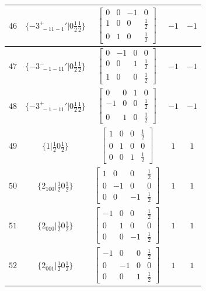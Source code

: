 \documentclass[fleqn,8pt]{jsarticle}
\begin{document}
\begin{longtable}{ccccc}
$ 46 $ & $ \{-3^{+}_{\,\,-11-1}{}'|0 \frac{1}{2} \frac{1}{2}\} $ & $ \begin{bmatrix} 0 & 0 & -1 & 0 \\ 1 & 0 & 0 & \frac{1}{2} \\ 0 & 1 & 0 & \frac{1}{2} \end{bmatrix} $ & $ -1 $ & $ -1 $ \\ \hline
$ 47 $ & $ \{-3^{-}_{\,\,-1-11}{}'|0 \frac{1}{2} \frac{1}{2}\} $ & $ \begin{bmatrix} 0 & -1 & 0 & 0 \\ 0 & 0 & 1 & \frac{1}{2} \\ 1 & 0 & 0 & \frac{1}{2} \end{bmatrix} $ & $ -1 $ & $ -1 $ \\ \hline
$ 48 $ & $ \{-3^{+}_{\,\,-1-11}{}'|0 \frac{1}{2} \frac{1}{2}\} $ & $ \begin{bmatrix} 0 & 0 & 1 & 0 \\ -1 & 0 & 0 & \frac{1}{2} \\ 0 & 1 & 0 & \frac{1}{2} \end{bmatrix} $ & $ -1 $ & $ -1 $ \\ \hline
$ 49 $ & $ \{1|\frac{1}{2} 0 \frac{1}{2}\} $ & $ \begin{bmatrix} 1 & 0 & 0 & \frac{1}{2} \\ 0 & 1 & 0 & 0 \\ 0 & 0 & 1 & \frac{1}{2} \end{bmatrix} $ & $ 1 $ & $ 1 $ \\ \hline
$ 50 $ & $ \{2{}_{100}|\frac{1}{2} 0 \frac{1}{2}\} $ & $ \begin{bmatrix} 1 & 0 & 0 & \frac{1}{2} \\ 0 & -1 & 0 & 0 \\ 0 & 0 & -1 & \frac{1}{2} \end{bmatrix} $ & $ 1 $ & $ 1 $ \\ \hline
$ 51 $ & $ \{2{}_{010}|\frac{1}{2} 0 \frac{1}{2}\} $ & $ \begin{bmatrix} -1 & 0 & 0 & \frac{1}{2} \\ 0 & 1 & 0 & 0 \\ 0 & 0 & -1 & \frac{1}{2} \end{bmatrix} $ & $ 1 $ & $ 1 $ \\ \hline
$ 52 $ & $ \{2{}_{001}|\frac{1}{2} 0 \frac{1}{2}\} $ & $ \begin{bmatrix} -1 & 0 & 0 & \frac{1}{2} \\ 0 & -1 & 0 & 0 \\ 0 & 0 & 1 & \frac{1}{2} \end{bmatrix} $ & $ 1 $ & $ 1 $ \\ \hline

\end{longtable}
\end{document}
